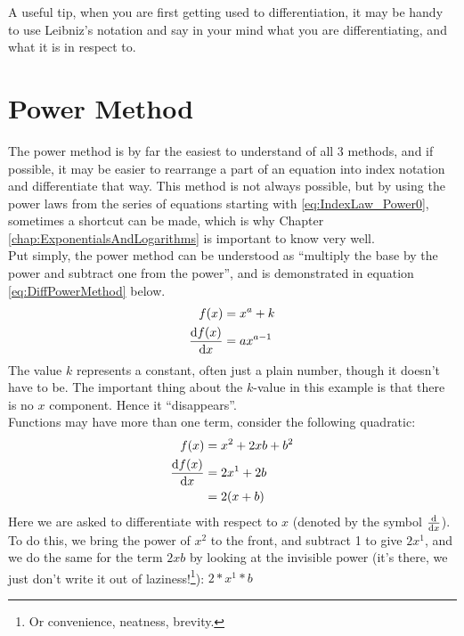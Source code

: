 A useful tip, when you are first getting used to differentiation, it may be
handy to use Leibniz's notation and say in your mind what you are
differentiating, and what it is in respect to.
\section{Power Method}
\label{sec:PowerMethod}
The power method is by far the easiest to understand of all 3 methods, and if
possible, it may be easier to rearrange a part of an equation into index
notation and differentiate that way. This method is not always possible,
but by using the power laws from the series of equations starting with
\ref{eq:IndexLaw_Power0}, sometimes a shortcut can be made, which is why
Chapter \ref{chap:ExponentialsAndLogarithms} is important to know very well.
\\
Put simply, the power method can be understood as ``multiply the base by the
power and subtract one from the power'', and is demonstrated in equation
\ref{eq:DiffPowerMethod} below.
\begin{align}
             f(x) & = {x}^{a} + k \label{eq:DiffPowerMethodKValue} \\
  \frac{\mathrm{d}f(x)}{\mathrm{d}x} & = a{x}^{a-1} \label{eq:DiffPowerMethod}
\end{align}
The value $k$ represents a constant, often just a plain number, though it
doesn't have to be. The important thing about the $k$-value in this example is
that there is no $x$ component. Hence it ``disappears''.\\
Functions may have more than one term, consider the following quadratic:
\begin{align}
  f(x)             & = {x}^{2} + 2xb + {b}^{2} \\
  \frac{\mathrm{d}f(x)}{\mathrm{d}x} & = 2{x}^{1} + 2b \\
                   & = 2(x+b) \label{eq:DiffPowerMethodRespectTo}
\end{align}
Here we are asked to differentiate with respect to $x$ (denoted by the symbol
$\frac{\mathrm{d}}{\mathrm{d}x}$). To do this, we bring the power of ${x}^{2}$ to the front, and
subtract 1 to give $2{x}^{1}$, and we do the same for the term ${2xb}$ by
looking at the invisible power (it's there, we just don't write it out of
laziness!\footnote{Or convenience, neatness, brevity.}): $2*{x}^{1}*b$
